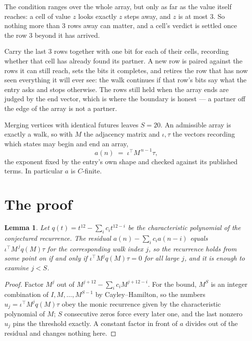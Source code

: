 \documentclass[11pt,a4paper]{article}
\theoremstyle{plain}
\newtheorem{lemma}[theorem]{Lemma}
\theoremstyle{definition}
\begin{document}
The condition ranges over the whole array, but only as far as the value itself reaches: a cell of value $z$ looks exactly $z$ steps away, and $z$ is at most $3$. So nothing more than $3$ rows away can matter, and a cell's verdict is settled once the row $3$ beyond it has arrived.

Carry the last $3$ rows together with one bit for each of their cells, recording whether that cell has already found its partner. A new row is paired against the rows it can still reach, sets the bits it completes, and retires the row that has now seen everything it will ever see: the walk continues if that row's bits say what the entry asks and stops otherwise. The rows still held when the array ends are judged by the end vector, which is where the boundary is honest --- a partner off the edge of the array is not a partner.

Merging vertices with identical futures leaves $S=20$. An admissible array is exactly a walk, so with $M$ the adjacency matrix and $\iota,\tau$ the vectors recording which states may begin and end an array,
\[
a(n)\;=\;\iota^{\!\top}M^{\,n-1}\tau ,
\]
the exponent fixed by the entry's own shape and checked against its published terms. In
particular $a$ is $C$-finite.

\section{The proof}

\begin{lemma}\label{lem:crit}
Let $q(t)=t^{12}-\sum_i c_it^{12-i}$ be the characteristic polynomial of the
conjectured recurrence. The residual $a(n)-\sum_ic_ia(n-i)$ equals
$\iota^{\!\top}M^{\,j}q(M)\tau$ for the corresponding walk index $j$, so the recurrence
holds from some point on if and only if $\iota^{\!\top}M^{j}q(M)\tau=0$ for all large $j$,
and it is enough to examine $j<S$.
\end{lemma}

\begin{proof}
Factor $M^{j}$ out of $M^{j+12}-\sum_ic_iM^{j+12-i}$. For the bound, $M^{S}$
is an integer combination of $I,M,\dots,M^{S-1}$ by Cayley--Hamilton, so the numbers
$u_j=\iota^{\!\top}M^{j}q(M)\tau$ obey the monic recurrence given by the characteristic
polynomial of $M$; $S$ consecutive zeros force every later one, and the last nonzero $u_j$
pins the threshold exactly. A constant factor in front of $a$ divides out of the residual and
changes nothing here.
\end{proof}
\end{document}
